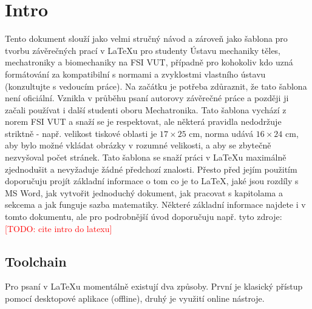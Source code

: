\chapter{Intro}
\label{chap:intro}
Tento dokument slouží jako velmi stručný návod a zároveň jako šablona pro tvorbu závěrečných prací v LaTeXu pro studenty Ústavu mechaniky těles, mechatroniky a biomechaniky na FSI VUT, případně pro kohokoliv kdo uzná formátování za kompatibilní s normami a zvyklostmi vlastního ústavu (konzultujte s vedoucím práce).
%
Na začátku je potřeba zdůraznit, že tato šablona není oficiální. Vznikla v průběhu psaní autorovy závěrečné práce a později ji začali používat i další studenti oboru Mechatronika. Tato šablona vychází z norem FSI VUT a snaží se je respektovat, ale některá pravidla nedodržuje striktně - např. velikost tiskové oblasti je $17\times25$ cm, norma udává $16\times24$ cm, aby bylo možné vkládat obrázky v rozumné velikosti, a aby se zbytečně nezvyšoval počet stránek.
%
Tato šablona se snaží práci v LaTeXu maximálně zjednodušit a nevyžaduje žádné předchozí znalosti. Přesto před jejím použitím doporučuju projít základní informace o tom co je to LaTeX, jaké jsou rozdíly s MS Word, jak vytvořit jednoduchý dokument, jak pracovat s kapitolama a sekcema a jak funguje sazba matematiky. Některé základní informace najdete i v tomto dokumentu, ale pro podrobnější úvod doporučuju např. tyto zdroje: \textcolor{red}{[TODO: cite intro do latexu]} 
%

\section{Toolchain}
\label{sec:Toolchain}
Pro psaní v LaTeXu momentálně existují dva způsoby.  První je klasický přístup pomocí desktopové aplikace (offline), druhý je využití online nástroje.

